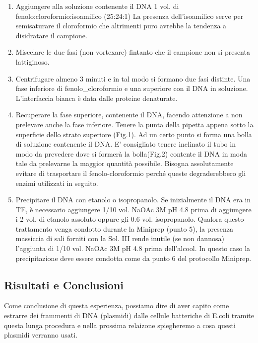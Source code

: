 \begin{enumerate}
  \item Aggiungere alla soluzione contenente il DNA 1 vol. di fenolo:cloroformio:isoamilico (25:24:1)
La presenza dell’isoamilico serve per semisaturare il cloroformio che altrimenti puro avrebbe la tendenza a disidratare il campione.

  \item Miscelare le due fasi (non vortexare) fintanto che il campione non si presenta lattiginoso.

  \item Centrifugare almeno 3 minuti e in tal modo si formano due fasi distinte. Una fase inferiore di fenolo_cloroformio e una superiore con il DNA in soluzione. L’interfaccia bianca è data dalle proteine denaturate.

  \item Recuperare la fase superiore, contenente il DNA, facendo attenzione a non prelevare anche la fase inferiore. Tenere la punta della pipetta appena sotto la superficie dello strato superiore (Fig.1). Ad un certo punto si forma una bolla di soluzione contenente il DNA. E’ consigliato tenere inclinato il tubo in modo da prevedere dove si formerà la bolla(Fig.2) contente il DNA in moda tale da prelevarne la maggior quantità possibile. Bisogna assolutamente evitare di trasportare il fenolo-cloroformio perché queste degraderebbero gli enzimi utilizzati in seguito.

  \item Precipitare il DNA con etanolo o isopropanolo. Se inizialmente il DNA era in TE, è necessario aggiungere 1/10 vol. NaOAc 3M pH 4.8 prima di aggiungere i 2 vol. di etanolo assoluto oppure gli 0.6 vol. isopropanolo. Qualora questo trattamento venga condotto durante la Miniprep (punto 5), la presenza massiccia di sali forniti con la Sol. III  rende inutile (se non dannosa) l’aggiunta di 1/10 vol. NaOAc 3M pH 4.8 prima dell’alcool. In questo caso la precipitazione deve essere condotta come da punto 6 del protocollo Miniprep.


\end{enumerate}

\subsection{Risultati e Conclusioni}

Come conclusione di questa esperienza, possiamo dire di aver capito come estrarre dei frammenti di DNA (plasmidi) dalle cellule batteriche di E.coli tramite questa lunga procedura e nella prossima relaizone spiegheremo a cosa questi plasmidi verranno usati.



